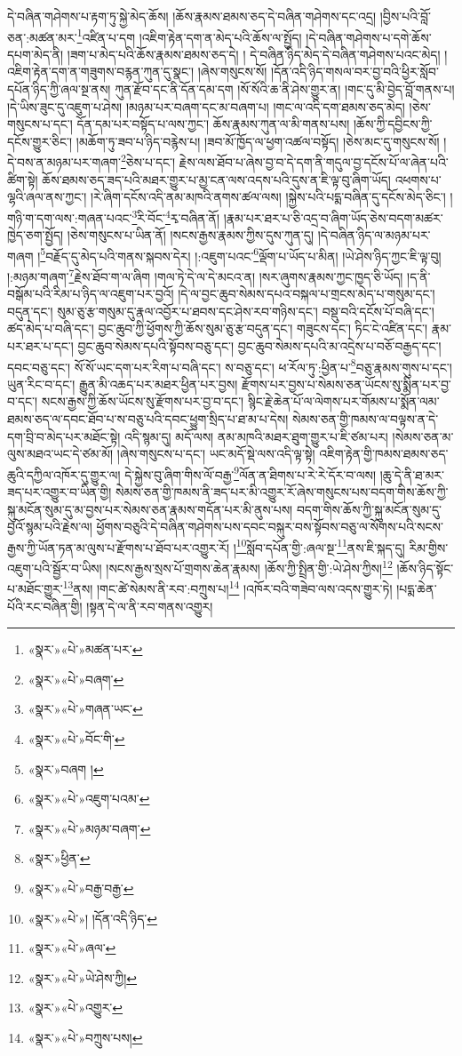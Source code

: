 དེ་བཞིན་གཤེགས་པ་རྟག་ཏུ་སྐྱེ་མེད་ཆོས། །ཆོས་རྣམས་ཐམས་ཅད་དེ་བཞིན་གཤེགས་དང་འདྲ། །བྱིས་པའི་བློ་ཅན་:མཚན་མར་\footnote{«སྣར་»«པེ་»མཚན་པར་}འཛིན་པ་དག །འཇིག་རྟེན་དག་ན་མེད་པའི་ཆོས་ལ་སྤྱོད། །དེ་བཞིན་གཤེགས་པ་དགེ་ཆོས་དཔག་མེད་ནི། །ཟག་པ་མེད་པའི་ཆོས་རྣམས་ཐམས་ཅད་དེ། །
དེ་བཞིན་ཉིད་མེད་དེ་བཞིན་གཤེགས་པའང་མེད། །འཇིག་རྟེན་དག་ན་གཟུགས་བརྙན་ཀུན་དུ་སྣང་། །ཞེས་གསུངས་སོ། །དོན་འདི་ཉིད་གསལ་བར་བྱ་བའི་ཕྱིར་སློབ་དཔོན་ཉིད་ཀྱི་ཞལ་སྔ་ནས། ཀུན་རྫོབ་དང་ནི་དོན་དམ་དག །སོ་སོའི་ཆ་ནི་ཤེས་གྱུར་ན། །གང་དུ་མི་བྱེད་བློ་གནས་པ། །དེ་ཡིས་ཟུང་དུ་འཇུག་པ་ཤེས། །མཉམ་པར་བཞག་དང་མ་བཞག་པ། །གང་ལ་འདི་དག་ཐམས་ཅད་མེད། །ཅེས་གསུངས་པ་དང་། དོན་དམ་པར་བསྟོད་པ་ལས་ཀྱང་། ཆོས་རྣམས་ཀུན་ལ་མི་གནས་པས། །ཆོས་ཀྱི་དབྱིངས་ཀྱི་དངོས་གྱུར་ཅིང་། །མཆོག་ཏུ་ཟབ་པ་ཉིད་བརྙེས་པ། །ཟབ་མོ་ཁྱོད་ལ་ཕྱག་འཚལ་བསྟོད། །ཅེས་མང་དུ་གསུངས་སོ། །དེ་བས་ན་མཉམ་པར་གཞག་\footnote{«སྣར་»«པེ་»བཞག་}ཅེས་པ་དང་། རྗེས་ལས་ཐོབ་པ་ཞེས་བྱ་བ་དེ་དག་ནི་གདུལ་བྱ་དངོས་པོ་ལ་ཞེན་པའི་ཚིག་སྟེ། ཆོས་ཐམས་ཅད་ཟད་པའི་མཐར་གྱུར་པ་མྱ་ངན་ལས་འདས་པའི་དུས་ན་ཇི་ལྟ་བུ་ཞིག་ཡོད། འཕགས་པ་ལྷའི་ཞལ་ནས་ཀྱང་། །རེ་ཞིག་དངོས་འདི་ནམ་མཁའི་ནགས་ཚལ་ལས། །སྐྱེས་པའི་པདྨ་བཞིན་དུ་དངོས་མེད་ཅིང་། །གཉི་ག་དག་ལས་:གཞན་པའང་\footnote{«སྣར་»«པེ་»གཞན་ཡང་}རི་བོང་\footnote{«སྣར་»«པེ་»བོང་གི་}རྭ་བཞིན་ནོ། །རྣམ་པར་ཐར་པ་ཅི་འདྲ་བ་ཞིག་ཡོད་ཅེས་བདག་མཚར་ཁྱེད་ཅག་སྤྱོད། །ཅེས་གསུངས་པ་ཡིན་ནོ། །སངས་རྒྱས་རྣམས་ཀྱིས་དུས་ཀུན་དུ། །དེ་བཞིན་ཉིད་ལ་མཉམ་པར་གཞག །\footnote{«སྣར་»བཞག །}བརྗོད་དུ་མེད་པའི་གནས་སྐབས་དེར། །:འཇུག་པའང་\footnote{«སྣར་»«པེ་»འཇུག་པའམ་}ལྡོག་པ་ཡོད་པ་མིན། །ཡེ་ཤེས་ཉིད་ཀྱང་ཇི་ལྟ་བུ། །:མཉམ་གཞག་\footnote{«སྣར་»«པེ་»མཉམ་བཞག་}རྗེས་ཐོབ་ག་ལ་ཞིག །གལ་ཏེ་དེ་ལ་དེ་མངའ་ན། །སར་ཞུགས་རྣམས་ཀྱང་ཁྱད་ཅི་ཡོད། །ད་ནི་བསྒོམ་པའི་རིམ་པ་ཉིད་ལ་འཇུག་པར་བྱའོ། །དེ་ལ་བྱང་ཆུབ་སེམས་དཔའ་བསྐལ་པ་གྲངས་མེད་པ་གསུམ་དང་། བདུན་དང་། སུམ་ཅུ་རྩ་གསུམ་དུ་རྣལ་འབྱོར་པ་ཐབས་དང་ཤེས་རབ་གཉིས་དང་། བསྡུ་བའི་དངོས་པོ་བཞི་དང་། ཚད་མེད་པ་བཞི་དང་། བྱང་ཆུབ་ཀྱི་ཕྱོགས་ཀྱི་ཆོས་སུམ་ཅུ་རྩ་བདུན་དང་། གཟུངས་དང་། ཏིང་ངེ་འཛིན་དང་། རྣམ་པར་ཐར་པ་དང་། བྱང་ཆུབ་སེམས་དཔའི་སྟོབས་བཅུ་དང་། བྱང་ཆུབ་སེམས་དཔའི་མ་འདྲེས་པ་བཅོ་བརྒྱད་དང་། དབང་བཅུ་དང་། སོ་སོ་ཡང་དག་པར་རིག་པ་བཞི་དང་། ས་བཅུ་དང་། ཕ་རོལ་ཏུ་:ཕྱིན་པ་\footnote{«སྣར་»ཕྱིན་}བཅུ་རྣམས་གུས་པ་དང་། ཡུན་རིང་བ་དང་། རྒྱུན་མི་འཆད་པར་མཐར་ཕྱིན་པར་བྱས། རྫོགས་པར་བྱས་པ་སེམས་ཅན་ཡོངས་སུ་སྨིན་པར་བྱ་བ་དང་། སངས་རྒྱས་ཀྱི་ཆོས་ཡོངས་སུ་རྫོགས་པར་བྱ་བ་དང་། སྙིང་རྗེ་ཆེན་པོ་ལ་ལེགས་པར་གོམས་པ་སྨོན་ལམ་ཐམས་ཅད་ལ་དབང་ཐོབ་པ་ས་བཅུ་པའི་དབང་ཕྱུག་སྲིད་པ་ཐ་མ་པ་དེས། སེམས་ཅན་གྱི་ཁམས་ལ་བལྟས་ན་དེ་དག་བྲི་བ་མེད་པར་མཐོང་སྟེ། འདི་སྙམ་དུ། མདོ་ལས། ནམ་མཁའི་མཐར་ཐུག་གྱུར་པ་ཇི་ཙམ་པར། །སེམས་ཅན་མ་ལུས་མཐའ་ཡང་དེ་ཙམ་མོ། །ཞེས་གསུངས་པ་དང་། ཡང་མདོ་སྡེ་ལས་འདི་ལྟ་སྟེ། འཇིག་རྟེན་གྱི་ཁམས་ཐམས་ཅད་ཆུའི་དཀྱིལ་འཁོར་དུ་གྱུར་ལ། དེ་སྐྱེས་བུ་ཞིག་གིས་ལོ་བརྒྱ་\footnote{«སྣར་»«པེ་»བརྒྱ་བརྒྱ་}ལོན་ན་ཐིགས་པ་རེ་རེ་དོར་བ་ལས། །ཆུ་དེ་ནི་ཐ་མར་ཟད་པར་འགྱུར་བ་ཡིན་གྱི། སེམས་ཅན་གྱི་ཁམས་ནི་ཟད་པར་མི་འགྱུར་རོ་ཞེས་གསུངས་པས་བདག་གིས་ཆོས་ཀྱི་སྐུ་མངོན་སུམ་དུ་མ་བྱས་པར་སེམས་ཅན་རྣམས་གདོན་པར་མི་ནུས་པས། བདག་གིས་ཆོས་ཀྱི་སྐུ་མངོན་སུམ་དུ་བྱའོ་སྙམ་པའི་རྗེས་ལ། ཕྱོགས་བཅུའི་དེ་བཞིན་གཤེགས་པས་དབང་བསྐུར་བས་སྟོབས་བཅུ་ལ་སོགས་པའི་སངས་རྒྱས་ཀྱི་ཡོན་ཏན་མ་ལུས་པ་རྫོགས་པ་ཐོབ་པར་འགྱུར་རོ། །\footnote{«སྣར་»«པེ་»། །དོན་འདི་ཉིད་}སློབ་དཔོན་གྱི་:ཞལ་སྔ་\footnote{«སྣར་»«པེ་»ཞལ་}ནས་ཇི་སྐད་དུ། རིམ་གྱིས་འཇུག་པའི་སྦྱོར་བ་ཡིས། །སངས་རྒྱས་སྲས་པོ་གྲགས་ཆེན་རྣམས། །ཆོས་ཀྱི་སྤྲིན་གྱི་:ཡེ་ཤེས་ཀྱིས།\footnote{«སྣར་»«པེ་»ཡེ་ཤེས་ཀྱི།} །ཆོས་ཉིད་སྟོང་པ་མཐོང་གྱུར་\footnote{«སྣར་»«པེ་»འགྱུར་}ནས། །གང་ཚེ་སེམས་ནི་རབ་:བཀྲུས་པ།\footnote{«སྣར་»«པེ་»བཀྲུས་པས།} །འཁོར་བའི་གཟེབ་ལས་འདས་གྱུར་ཏེ། །པདྨ་ཆེན་པོའི་རང་བཞིན་གྱི། །སྟན་དེ་ལ་ནི་རབ་གནས་འགྱུར། 